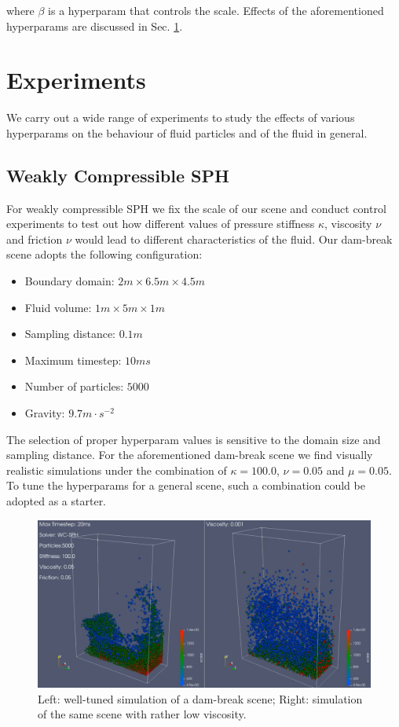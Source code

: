 \documentclass[
	11pt, 
	DIV10,
	ngerman,
	a4paper, 
	oneside, 
	headings=normal, 
	captions=tableheading,
	final, 
	numbers=noenddot
]{scrartcl}
\begin{document}
where $ \beta $ is a hyperparam that controls the scale. Effects of the aforementioned hyperparams are discussed in Sec. \ref{sec4}.

\section{Experiments}
\label{sec4}

We carry out a wide range of experiments to study the effects of various hyperparams on the behaviour of fluid particles and of the fluid in general.

\subsection{Weakly Compressible SPH}

For weakly compressible SPH we fix the scale of our scene and conduct control experiments to test out how different values of pressure stiffness $ \kappa $, viscosity $ \nu $ and friction $ \nu$ would lead to different characteristics of the fluid. Our dam-break scene adopts the following configuration:

\begin{itemize}
    \item Boundary domain: $ 2m \times 6.5m \times 4.5m $
    \item Fluid volume: $ 1m \times 5m \times 1m $
    \item Sampling distance: $ 0.1m $
    \item Maximum timestep: $ 10ms $
    \item Number of particles: $ 5000 $
    \item Gravity: $ 9.7m \cdot s^{-2} $
\end{itemize}

The selection of proper hyperparam values is sensitive to the domain size and sampling distance. For the aforementioned dam-break scene we find visually realistic simulations under the combination of $ \kappa = 100.0 $, $ \nu = 0.05 $ and $ \mu = 0.05 $. To tune the hyperparams for a general scene, such a combination could be adopted as a starter.

\begin{figure}
    \centering
    \includegraphics[width=.6\textwidth]{pics/wcsph_viscosity.png}
    \caption{Left: well-tuned simulation of a dam-break scene; Right: simulation of the same scene with rather low viscosity.}
    \label{fig:visco}
\end{figure}
\end{document}
